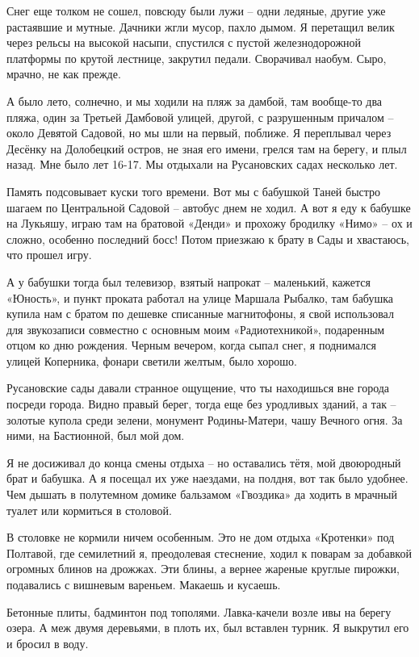 Снег еще толком не сошел, повсюду были лужи – одни ледяные, другие уже растаявшие и мутные. Дачники жгли мусор, пахло дымом. Я перетащил велик через рельсы на высокой насыпи, спустился с пустой железнодорожной платформы по крутой лестнице, закрутил педали. Сворачивал наобум. Сыро, мрачно, не как прежде.

А было лето, солнечно, и мы ходили на пляж за дамбой, там вообще-то два пляжа, один за Третьей Дамбовой улицей, другой, с разрушенным причалом – около Девятой Садовой, но мы шли на первый, поближе. Я переплывал через Десёнку на Долобецкий остров, не зная его имени, грелся там на берегу, и плыл назад. Мне было лет 16-17. Мы отдыхали на Русановских садах несколько лет.

Память подсовывает куски того времени. Вот мы с бабушкой Таней быстро шагаем по Центральной Садовой – автобус днем не ходил. А вот я еду к бабушке на Лукьяшу, играю там на братовой «Денди» и прохожу бродилку «Нимо» – ох и сложно, особенно последний босс! Потом приезжаю к брату в Сады и хвастаюсь, что прошел игру.

А у бабушки тогда был телевизор, взятый напрокат – маленький, кажется «Юность», и пункт проката работал на улице Маршала Рыбалко, там бабушка купила нам с братом по дешевке списанные магнитофоны, я свой использовал для звукозаписи совместно с основным моим «Радиотехникой», подаренным отцом ко дню рождения. Черным вечером, когда сыпал снег, я поднимался улицей Коперника, фонари светили желтым, было хорошо.

Русановские сады давали странное ощущение, что ты находишься вне города посреди города. Видно правый берег, тогда еще без уродливых зданий, а так – золотые купола среди зелени, монумент Родины-Матери, чашу Вечного огня. За ними, на Бастионной, был мой дом.

Я не досиживал до конца смены отдыха – но оставались тётя, мой двоюродный брат и бабушка. А я посещал их уже наездами, на полдня, вот так было удобнее. Чем дышать в полутемном домике бальзамом «Гвоздика» да ходить в мрачный туалет или кормиться в столовой.

В столовке не кормили ничем особенным. Это не дом отдыха «Кротенки» под Полтавой, где семилетний я, преодолевая стеснение, ходил к поварам за добавкой огромных блинов на дрожжах. Эти блины, а вернее жареные круглые пирожки, подавались с вишневым вареньем. Макаешь и кусаешь.

Бетонные плиты, бадминтон под тополями. Лавка-качели возле ивы на берегу озера. А меж двумя деревьями, в плоть их, был вставлен турник. Я выкрутил его и бросил в воду. 

